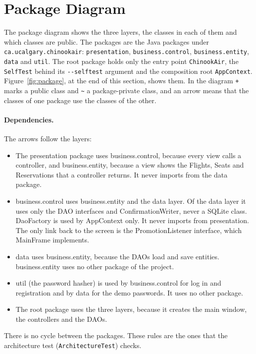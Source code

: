 \section{Package Diagram}

The package diagram shows the three layers, the classes in each of them and
which classes are public. The packages are the Java packages under
\texttt{ca.ucalgary.chinookair}: \texttt{presentation}, \texttt{business.control},
\texttt{business.entity}, \texttt{data} and \texttt{util}. The root package holds
only the entry point \texttt{ChinookAir}, the \texttt{SelfTest} behind its
\texttt{-{}-selftest} argument and the composition root
\texttt{AppContext}. Figure~\ref{fig:package}, at the end of this section, shows them. In the diagram \texttt{+} marks a public class and
\texttt{\textasciitilde} a package-private class, and an arrow means that the
classes of one package use the classes of the other.

\paragraph{Dependencies.} The arrows follow the layers:
\begin{itemize}
\item The presentation package uses business.control, because every view
  calls a controller, and business.entity, because a view shows the
  Flights, Seats and Reservations that a controller returns. It never imports
  from the data package.
\item business.control uses business.entity and the data layer.
  Of the data layer it uses only the DAO interfaces and
  ConfirmationWriter, never a SQLite class. DaoFactory is used by
  AppContext only. It never imports from
  presentation. The only link back to the screen is the
  PromotionListener interface, which MainFrame implements.
\item data uses business.entity, because the DAOs load and
  save entities. business.entity uses no other package of the project.
\item util (the password hasher) is used by business.control
  for log in and registration and by data for the demo passwords. It
  uses no other package.
\item The root package uses the three layers, because it creates the main
  window, the controllers and the DAOs.
\end{itemize}
There is no cycle between the packages. These rules are the ones that the
architecture test (\texttt{ArchitectureTest}) checks.

